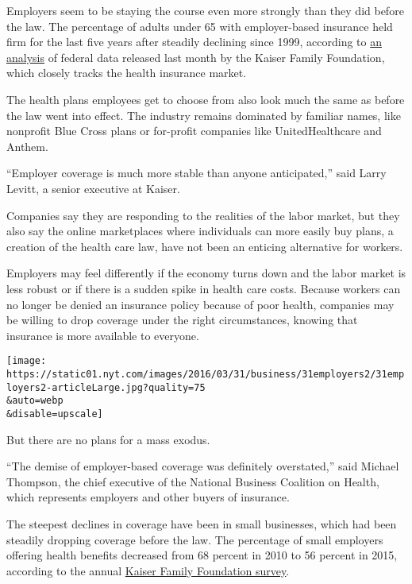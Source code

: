 Employers seem to be staying the course even more strongly than they did
before the law. The percentage of adults under 65 with employer-based
insurance held firm for the last five years after steadily declining
since 1999, according to
\href{http://kff.org/private-insurance/issue-brief/trends-in-employer-sponsored-insurance-offer-and-coverage-rates-1999-2014/}{an
analysis} of federal data released last month by the Kaiser Family
Foundation, which closely tracks the health insurance market.

The health plans employees get to choose from also look much the same as
before the law went into effect. The industry remains dominated by
familiar names, like nonprofit Blue Cross plans or for-profit companies
like UnitedHealthcare and Anthem.

``Employer coverage is much more stable than anyone anticipated,'' said
Larry Levitt, a senior executive at Kaiser.

Companies say they are responding to the realities of the labor market,
but they also say the online marketplaces where individuals can more
easily buy plans, a creation of the health care law, have not been an
enticing alternative for workers.

Employers may feel differently if the economy turns down and the labor
market is less robust or if there is a sudden spike in health care
costs. Because workers can no longer be denied an insurance policy
because of poor health, companies may be willing to drop coverage under
the right circumstances, knowing that insurance is more available to
everyone.

\texttt{[image: https://static01.nyt.com/images/2016/03/31/business/31employers2/31employers2-articleLarge.jpg?quality=75\\\&auto=webp\\\&disable=upscale]}

But there are no plans for a mass exodus.

``The demise of employer-based coverage was definitely overstated,''
said Michael Thompson, the chief executive of the National Business
Coalition on Health, which represents employers and other buyers of
insurance.

The steepest declines in coverage have been in small businesses, which
had been steadily dropping coverage before the law. The percentage of
small employers offering health benefits decreased from 68 percent in
2010 to 56 percent in 2015, according to the annual
\href{http://kff.org/report-section/ehbs-2015-section-two-health-benefits-offer-rates/}{Kaiser
Family Foundation survey}.


